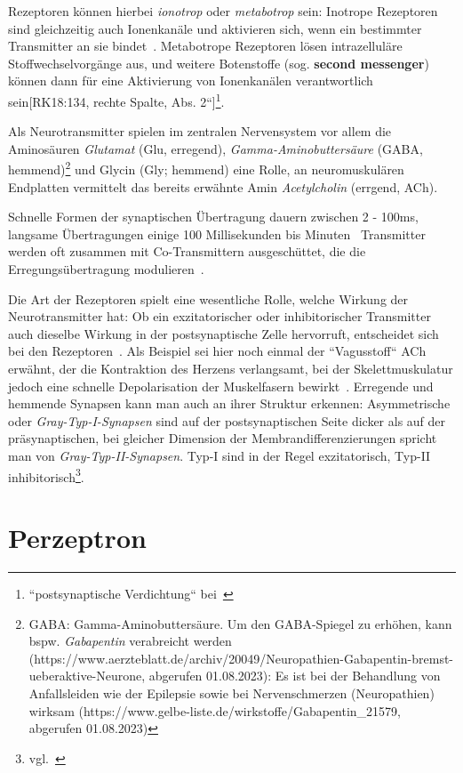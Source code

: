{Rezeptoren können hierbei \textit{ionotrop} oder \textit{metabotrop} sein: Inotrope Rezeptoren sind gleichzeitig auch Ionenkanäle und aktivieren sich, wenn ein bestimmter Transmitter an sie bindet~\cite[109]{HS19b}.
Metabotrope Rezeptoren lösen intrazelluläre Stoffwechselvorgänge aus, und weitere Botenstoffe (sog. \textbf{second messenger}) können dann für eine Aktivierung von Ionenkanälen verantwortlich sein[RK18:134, rechte Spalte, Abs. 2``]\footnote{
    ``postsynaptische Verdichtung`` bei~\cite[123]{BCP18}
}.

Als Neurotransmitter spielen im zentralen Nervensystem vor allem  die Aminosäuren \textit{Glutamat} (Glu, erregend), \textit{Gamma-Aminobuttersäure} (GABA, hemmend)\footnote{
    GABA: Gamma-Aminobuttersäure. Um den GABA-Spiegel zu erhöhen, kann bspw. \textit{Gabapentin} verabreicht werden (https://www.aerzteblatt.de/archiv/20049/Neuropathien-Gabapentin-bremst-ueberaktive-Neurone, abgerufen 01.08.2023): Es ist bei der Behandlung von Anfallsleiden wie der Epilepsie sowie bei Nervenschmerzen (Neuropathien) wirksam (https://www.gelbe-liste.de/wirkstoffe/Gabapentin_21579, abgerufen 01.08.2023)
} und Glycin (Gly; hemmend) eine Rolle, an neuromuskulären Endplatten vermittelt das bereits erwähnte Amin \textit{Acetylcholin} (errgend, ACh).

Schnelle Formen der synaptischen Übertragung dauern zwischen 2 - 100ms, langsame Übertragungen einige 100 Millisekunden bis Minuten~\cite[129 f.]{BCP18} Transmitter werden oft zusammen mit Co-Transmittern ausgeschüttet, die die Erregungsübertragung modulieren~\cite[52]{SD07}.

Die Art der Rezeptoren spielt eine wesentliche Rolle, welche Wirkung der Neurotransmitter hat: Ob ein exzitatorischer oder inhibitorischer Transmitter auch dieselbe Wirkung in der postsynaptische Zelle hervorruft, entscheidet sich bei den Rezeptoren~\cite[109]{HS19b}.
Als Beispiel sei hier noch einmal der ``Vagusstoff`` ACh erwähnt, der die Kontraktion des Herzens verlangsamt, bei der Skelettmuskulatur jedoch eine schnelle Depolarisation der Muskelfasern bewirkt~\cite[137]{BCP18}.
Erregende und hemmende Synapsen kann man auch an ihrer Struktur erkennen: Asymmetrische oder \textit{Gray-Typ-I-Synapsen} sind auf der postsynaptischen Seite dicker als auf der präsynaptischen, bei gleicher Dimension der Membrandifferenzierungen spricht man von \textit{Gray-Typ-II-Synapsen}. Typ-I sind in der Regel exzitatorisch, Typ-II inhibitorisch\footnote{
    vgl.~\cite[127 u. 147]{BCP18}
    }.


\section{Perzeptron}\label{appendix:perzeptron}
}
